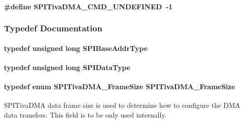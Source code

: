 \paragraph[{S\-P\-I\-Tiva\-D\-M\-A\-\_\-\-C\-M\-D\-\_\-\-U\-N\-D\-E\-F\-I\-N\-E\-D}]{\setlength{\rightskip}{0pt plus 5cm}\#define S\-P\-I\-Tiva\-D\-M\-A\-\_\-\-C\-M\-D\-\_\-\-U\-N\-D\-E\-F\-I\-N\-E\-D~-\/1}\label{_s_p_i_tiva_d_m_a_8h_a265c7aa839623d2c27b685cfb59ef654}


\subsubsection{Typedef Documentation}
\paragraph[{S\-P\-I\-Base\-Addr\-Type}]{\setlength{\rightskip}{0pt plus 5cm}typedef unsigned long {\bf S\-P\-I\-Base\-Addr\-Type}}\label{_s_p_i_tiva_d_m_a_8h_a4b7e9f3739f6196bed13f9c3c549c96d}
\paragraph[{S\-P\-I\-Data\-Type}]{\setlength{\rightskip}{0pt plus 5cm}typedef unsigned long {\bf S\-P\-I\-Data\-Type}}\label{_s_p_i_tiva_d_m_a_8h_ac69c2f2d8cda29733c058bf8e0233af7}
\paragraph[{S\-P\-I\-Tiva\-D\-M\-A\-\_\-\-Frame\-Size}]{\setlength{\rightskip}{0pt plus 5cm}typedef enum {\bf S\-P\-I\-Tiva\-D\-M\-A\-\_\-\-Frame\-Size}  {\bf S\-P\-I\-Tiva\-D\-M\-A\-\_\-\-Frame\-Size}}\label{_s_p_i_tiva_d_m_a_8h_ae24d181062a7ee8b005ec1718f52a46e}


S\-P\-I\-Tiva\-D\-M\-A data frame size is used to determine how to configure the D\-M\-A data transfers. This field is to be only used internally. 

